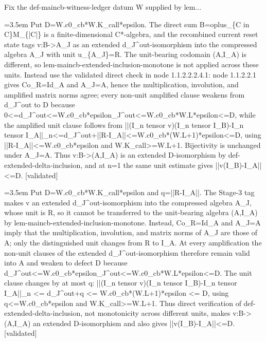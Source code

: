 \documentclass{article}
\newcommand{\step}[1]{\par\noindent\hangindent=3.5em\hangafter=1%
  \makebox[3.5em][l]{\textbf{#1.}}}
\newcommand{\steptag}[1]{\hfill{\small\textsf{[#1]}}}
\begin{document}
\begin{proofbox}{Fix the def-maincb-witness-ledger datum W supplied by lem...}
\step{1.1.2.2.2.4} Put D=W.c0\_cb*W.K\_call*epsilon. The direct sum B=oplus\_\{C in C\}M\_\{|C|\} is a finite-dimensional C*-algebra, and the recombined current reset state tags v:B->A\_J as an extended d\_J\textasciicircum{}out-isomorphism into the compressed algebra A\_J with unit u\_\{A\_J\}=R. The unit-bearing codomain (A,I\_A) is different, so lem-maincb-extended-inclusion-monotone is not applied across these units. Instead use the validated direct check in node 1.1.2.2.2.4.1: node 1.1.2.2.1 gives Co\_R=Id\_A and A\_J=A, hence the multiplication, involution, and amplified matrix norms agree; every non-unit amplified clause weakens from d\_J\textasciicircum{}out to D because 0<=d\_J\textasciicircum{}out<=W.c0\_cb*epsilon\_J\textasciicircum{}out<=W.c0\_cb*W.L*epsilon<=D, while the amplified unit clause follows from ||(I\_n tensor v)(I\_n tensor I\_B)-I\_n tensor I\_A||\_n<=d\_J\textasciicircum{}out+||R-I\_A||<=W.c0\_cb*(W.L+1)*epsilon<=D, using ||R-I\_A||<=W.c0\_cb*epsilon and W.K\_call>=W.L+1. Bijectivity is unchanged under A\_J=A. Thus v:B->(A,I\_A) is an extended D-isomorphism by def-extended-delta-inclusion, and at n=1 the same unit estimate gives ||v(I\_B)-I\_A||<=D. \steptag{validated} \\[6pt]
\step{1.1.2.2.2.4.1} Put D=W.c0\_cb*W.K\_call*epsilon and q=||R-I\_A||. The Stage-3 tag makes v an extended d\_J\textasciicircum{}out-isomorphism into the compressed algebra A\_J, whose unit is R, so it cannot be transferred to the unit-bearing algebra (A,I\_A) by lem-maincb-extended-inclusion-monotone. Instead, Co\_R=Id\_A and A\_J=A imply that the multiplication, involution, and matrix norms of A\_J are those of A; only the distinguished unit changes from R to I\_A. At every amplification the non-unit clauses of the extended d\_J\textasciicircum{}out-isomorphism therefore remain valid into A and weaken to defect D because d\_J\textasciicircum{}out<=W.c0\_cb*epsilon\_J\textasciicircum{}out<=W.c0\_cb*W.L*epsilon<=D. The unit clause changes by at most q: ||(I\_n tensor v)(I\_n tensor I\_B)-I\_n tensor I\_A||\_n <= d\_J\textasciicircum{}out+q <= W.c0\_cb*(W.L+1)*epsilon <= D, using q<=W.c0\_cb*epsilon and W.K\_call>=W.L+1. Thus direct verification of def-extended-delta-inclusion, not monotonicity across different units, makes v:B->(A,I\_A) an extended D-isomorphism and also gives ||v(I\_B)-I\_A||<=D. \steptag{validated} \\[6pt]

\end{proofbox}
\end{document}
